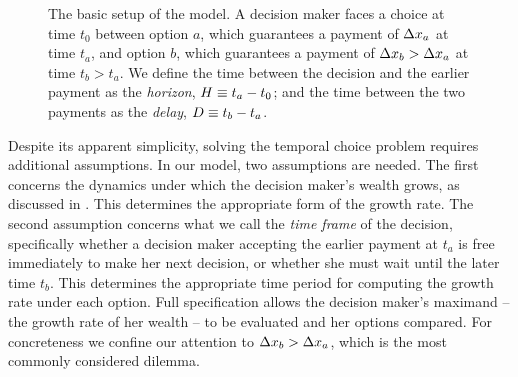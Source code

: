 \begin{figure}[!htb]
\centering
{}
\caption{The basic setup of the model. A decision maker faces a choice at time $t_0$ between option $a$, which guarantees a payment of $\Delta x_a$ at time $t_a$, and option $b$, which guarantees a payment of $\Delta x_b>\Delta x_a$ at time $t_b>t_a$. We define the time between the decision and the earlier payment as the {\it horizon}, $H\equiv t_a-t_0$; and the time between the two payments as the {\it delay}, $D\equiv t_b-t_a$.}
\end{figure}

Despite its apparent simplicity, solving the temporal choice problem requires additional assumptions. In our model, two assumptions are needed. The first concerns the dynamics under which the decision maker's wealth grows, as discussed in . This determines the appropriate form of the growth rate. The second assumption concerns what we call the \textit{time frame} of the decision, specifically whether a decision maker accepting the earlier payment at $t_a$ is free immediately to make her next decision, or whether she must wait until the later time $t_b$. This determines the appropriate time period for computing the growth rate under each option. Full specification allows the decision maker's maximand -- the growth rate of her wealth -- to be evaluated and her options compared. For concreteness we confine our attention to $\Delta x_b > \Delta x_a$, which is the most commonly considered dilemma.

